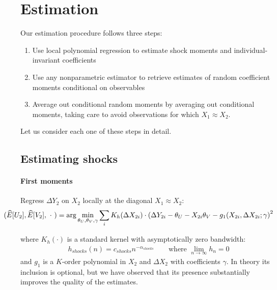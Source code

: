 

\section{Estimation} \label{sec:estimation}

Our estimation procedure follows three steps:

\begin{enumerate}
  \item Use local polynomial regression to estimate shock moments and individual-invariant coefficients
  \item Use any nonparametric estimator to retrieve estimates of random coefficient moments conditional on observables
  \item Average out conditional random moments by averaging out conditional moments, taking care to avoid
  observations for which $X_1 \approx X_2$.
\end{enumerate}

Let us consider each one of these steps in detail.

\subsection*{Estimating shocks}

\paragraph{First moments} Regress $\Delta Y_2$ on $X_2$ locally at the diagonal $X_1 \approx X_2$:
\begin{align}
  \hspace*{-1cm}
  (\widehat{E}[U_2], \widehat{E}[V_2], \ \cdot \ ) = \arg \min_{\theta_{U} ,\theta_{V}, \gamma}
\sum_{i} K_h (\Delta X_{2i}) \cdot 
      \left( \Delta Y_{2i} - \theta_{U} - X_{2i}\theta_{V} - g_1(X_{2i}, \Delta X_{2i}; \gamma \right)^2
\end{align}

\noindent where $K_h(\cdot)$ is a standard kernel with asymptotically zero bandwidth:
\begin{align}
  h_{shocks}(n) = c_{shocks}n^{−\alpha_{shocks}} \qquad \text{where } \lim_{n\rightarrow \infty} h_{n} = 0
\end{align}
\noindent and $g_1$ is a $K$-order polynomial in $X_2$ and $\Delta X_2$ with coefficients $\gamma$. In theory its inclusion is optional, but we have observed that its presence substantially improves the quality of the estimates. 

